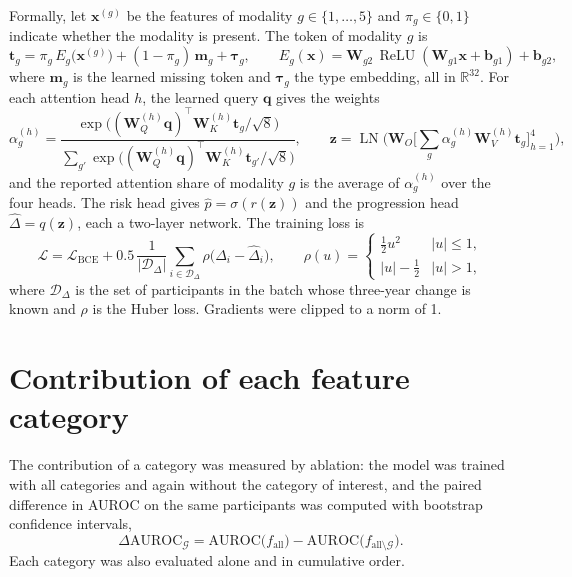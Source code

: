 Formally, let $\mathbf{x}^{(g)}$ be the features of modality $g \in \{1, \dots, 5\}$ and $\pi_g \in \{0, 1\}$ indicate whether the modality is present. The token of modality $g$ is
\begin{equation}
\mathbf{t}_g = \pi_g\, E_g\big(\mathbf{x}^{(g)}\big) + (1 - \pi_g)\, \mathbf{m}_g + \boldsymbol{\tau}_g, \qquad
E_g(\mathbf{x}) = \mathbf{W}_{g2}\, \operatorname{ReLU}(\mathbf{W}_{g1}\mathbf{x} + \mathbf{b}_{g1}) + \mathbf{b}_{g2},
\end{equation}
where $\mathbf{m}_g$ is the learned missing token and $\boldsymbol{\tau}_g$ the type embedding, all in $\mathbb{R}^{32}$. For each attention head $h$, the learned query $\mathbf{q}$ gives the weights
\begin{equation}
\alpha_{g}^{(h)} = \frac{\exp\big( (\mathbf{W}^{(h)}_Q \mathbf{q})^{\top} \mathbf{W}^{(h)}_K \mathbf{t}_g / \sqrt{8} \big)}{\sum_{g'} \exp\big( (\mathbf{W}^{(h)}_Q \mathbf{q})^{\top} \mathbf{W}^{(h)}_K \mathbf{t}_{g'} / \sqrt{8} \big)}, \qquad
\mathbf{z} = \operatorname{LN}\Big( \mathbf{W}_O \big[ \textstyle\sum_g \alpha^{(h)}_g \mathbf{W}^{(h)}_V \mathbf{t}_g \big]_{h=1}^{4} \Big),
\end{equation}
and the reported attention share of modality $g$ is the average of $\alpha^{(h)}_g$ over the four heads. The risk head gives $\hat{p} = \sigma(r(\mathbf{z}))$ and the progression head $\hat{\Delta} = q(\mathbf{z})$, each a two-layer network. The training loss is
\begin{equation}
\mathcal{L} = \mathcal{L}_{\text{BCE}} + 0.5\, \frac{1}{|\mathcal{D}_\Delta|} \sum_{i \in \mathcal{D}_\Delta} \rho\big(\Delta_i - \hat{\Delta}_i\big), \qquad
\rho(u) = \begin{cases} \tfrac{1}{2}u^2 & |u| \le 1, \\ |u| - \tfrac{1}{2} & |u| > 1, \end{cases}
\end{equation}
where $\mathcal{D}_\Delta$ is the set of participants in the batch whose three-year change is known and $\rho$ is the Huber loss. Gradients were clipped to a norm of 1.

\section{Contribution of each feature category}

The contribution of a category was measured by ablation: the model was trained with all categories and again without the category of interest, and the paired difference in AUROC on the same participants was computed with bootstrap confidence intervals,
\begin{equation}
\Delta\text{AUROC}_{\mathcal{G}} = \text{AUROC}\big(f_{\text{all}}\big) - \text{AUROC}\big(f_{\text{all} \setminus \mathcal{G}}\big).
\end{equation} Each category was also evaluated alone and in cumulative order.

